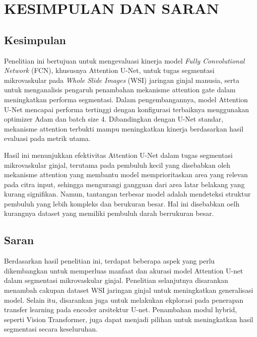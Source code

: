 \chapter{KESIMPULAN DAN SARAN}

\section{Kesimpulan}

\noindent Penelitian ini bertujuan untuk mengevaluasi kinerja model \textit{Fully Convolutional Network} (FCN), khususnya Attention U-Net, untuk tugas segmentasi mikrovaskular pada \textit{Whole Slide Images} (WSI) jaringan ginjal manusia, serta untuk menganalisis pengaruh penambahan mekanisme attention gate dalam meningkatkan performa segmentasi. Dalam pengembangannya, model Attention U-Net mencapai performa tertinggi dengan konfigurasi terbaiknya menggunakan optimizer Adam dan batch size 4. Dibandingkan dengan U-Net standar, mekanisme attention terbukti mampu meningkatkan kinerja berdasarkan hasil evaluasi pada metrik utama.

\noindent Hasil ini menunjukkan efektivitas Attention U-Net dalam tugas segmentasi mikrovaskular ginjal, terutama pada pembuluh kecil yang disebabkan oleh mekanisme attention yang membantu model memprioritaskan area yang relevan pada citra input, sehingga mengurangi gangguan dari area latar belakang yang kurang signifikan. Namun, tantangan terbesar model adalah mendeteksi struktur pembuluh yang lebih kompleks dan berukuran besar. Hal ini disebabkan oelh kurangnya dataset yang memiliki pembuluh darah berrukuran besar.

\section{Saran}

Berdasarkan hasil penelitian ini, terdapat beberapa aspek yang perlu dikembangkan untuk memperluas manfaat dan akurasi model Attention U-net dalam segmentasi mikrovaskular ginjal. Penelitian selanjutnya disarankan menambah cakupan dataset WSI jaringan ginjal untuk meningkatkan generalisasi model. Selain itu, disarankan juga untuk melakukan ekplorasi pada penerapan transfer learning pada encoder arsitektur U-net. Penambahan modul hybrid, seperti Vision Transformer, juga dapat menjadi pilihan untuk meningkatkan hasil segmentasi secara keseluruhan.

